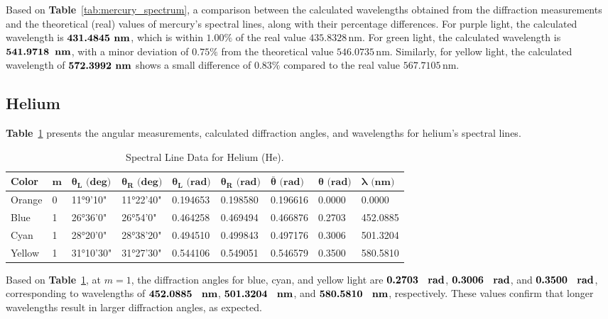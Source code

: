 \documentclass[a4paper,11pt]{article}
\begin{document}
Based on \textbf{Table}~\ref{tab:mercury_spectrum}, a comparison between the calculated wavelengths obtained from the diffraction measurements and the theoretical (real) values of mercury's spectral lines, along with their percentage differences. For purple light, the calculated wavelength is \(\textbf{431.4845 \text{nm}}\), which is within \(1.00\%\) of the real value \(435.8328 \, \text{nm}\). For green light, the calculated wavelength is \(\textbf{541.9718\, \text{nm}}\), with a minor deviation of \(0.75\%\) from the theoretical value \(546.0735 \, \text{nm}\). Similarly, for yellow light, the calculated wavelength of \(\textbf{572.3992 \text{nm}}\) shows a small difference of \(0.83\%\) compared to the real value \(567.7105 \, \text{nm}\). 

\newpage
\subsection*{Helium}
\label{sec:helium}

\textbf{Table}~\ref{tab:spectral_data_he} presents the angular measurements, calculated diffraction angles, and wavelengths for helium’s spectral lines.
\begin{table}[H]
  \centering
  \begin{tabular}{lllllllll}
  \toprule
  \textbf{Color} & \(\boldsymbol{m}\) & \(\boldsymbol{\theta_L \text{ (deg)}}\) & \(\boldsymbol{\theta_R \text{ (deg)}}\) & \(\boldsymbol{\theta_L \text{ (rad)}}\) & \(\boldsymbol{\theta_R \text{ (rad)}}\) & \(\boldsymbol{\bar \theta \text{ (rad)}}\) & \(\boldsymbol{\theta \text{ (rad)}}\) & \(\boldsymbol{\lambda \text{ (nm)}}\) \\
  \midrule
  Orange & 0 & 11°9'10"  & 11°22'40"  & 0.194653 & 0.198580 & 0.196616 & 0.0000 & 0.0000 \\
  Blue & 1 & 26°36'0"  & 26°54'0"   & 0.464258 & 0.469494 & 0.466876 & 0.2703 & 452.0885 \\
  Cyan  & 1 & 28°20'0"  & 28°38'20"  & 0.494510 & 0.499843 & 0.497176 & 0.3006 & 501.3204 \\
  Yellow & 1 & 31°10'30" & 31°27'30"  & 0.544106 & 0.549051 & 0.546579 & 0.3500 & 580.5810 \\
  \bottomrule
  \end{tabular}
  \caption{Spectral Line Data for Helium (He).}
  \label{tab:spectral_data_he}
\end{table}
Based on \textbf{Table}~\ref{tab:spectral_data_he}, at \( m = 1 \), the diffraction angles for blue, cyan, and yellow light are \(\textbf{0.2703 \, \text{rad}}\), \(\textbf{0.3006 \, \text{rad}}\), and \(\textbf{0.3500 \, \text{rad}}\), corresponding to wavelengths of \(\textbf{452.0885 \, \text{nm}}\), \(\textbf{501.3204 \, \text{nm}}\), and \(\textbf{580.5810 \, \text{nm}}\), respectively. These values confirm that longer wavelengths result in larger diffraction angles, as expected.\\
\end{document}
